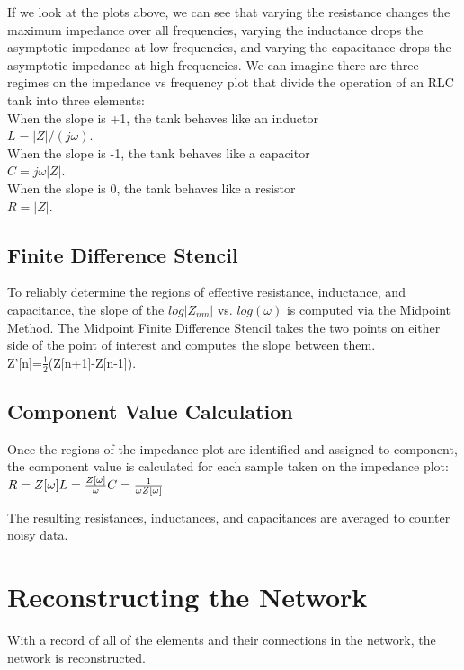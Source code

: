 If we look at the plots above, we can see that varying the resistance changes the maximum impedance over all frequencies, varying the inductance drops the asymptotic impedance at low frequencies, and varying the capacitance drops the asymptotic impedance at high frequencies.
We can imagine there are three regimes on the impedance vs frequency plot that divide the operation of an RLC tank into three elements:\\
When the slope is +1, the tank behaves like an inductor\\
$L=|Z|/(j\omega)$.\\
When the slope is -1, the tank behaves like a capacitor\\
$C=j\omega |Z|$.\\
When the slope is 0, the tank behaves like a resistor\\
$R=|Z|$.


\subsection{Finite Difference Stencil}
To reliably determine the regions of effective resistance, inductance, and capacitance, the slope of the $log{|Z_{nm}|}$ vs. $log{(\omega)}$ is computed via the Midpoint Method.
The Midpoint Finite Difference Stencil takes the two points on either side of the point of interest and computes the slope between them.\\
Z'[n]=$\frac{1}{2}$(Z[n+1]-Z[n-1]).

\subsection{Component Value Calculation}
Once the regions of the impedance plot are identified and assigned to component, the component value is calculated for each sample taken on the impedance plot:\\
$R = Z[\omega]\\
L = \frac{Z[\omega]}{\omega}\\
C = \frac{1}{\omega Z[\omega]} 
$ 

The resulting resistances, inductances, and capacitances are averaged to counter noisy data.


\section{Reconstructing the Network}
With a record of all of the elements and their connections in the network, the network is reconstructed.
